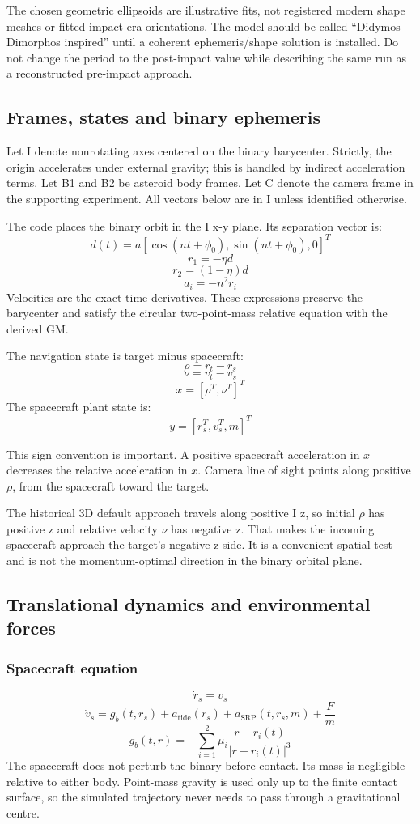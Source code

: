 \documentclass[11pt,a4paper]{article}
\begin{document}
The chosen geometric ellipsoids are illustrative fits, not registered modern shape meshes or fitted impact-era orientations. The model should be called ``Didymos-Dimorphos inspired'' until a coherent ephemeris/shape solution is installed. Do not change the period to the post-impact value while describing the same run as a reconstructed pre-impact approach.

\subsection{Frames, states and binary ephemeris}
Let I denote nonrotating axes centered on the binary barycenter. Strictly, the origin accelerates under external gravity; this is handled by indirect acceleration terms. Let B1 and B2 be asteroid body frames. Let C denote the camera frame in the supporting experiment. All vectors below are in I unless identified otherwise.

The code places the binary orbit in the I x-y plane. Its separation vector is:
\[ d(t) = a [\cos(nt+\phi_{0}), \sin(nt+\phi_{0}), 0]^T \]
\[ r_{1} = -\eta d \]
\[ r_{2} = (1-\eta)d \]
\[ a_{i} = -n^{2}r_{i} \]
Velocities are the exact time derivatives. These expressions preserve the barycenter and satisfy the circular two-point-mass relative equation with the derived GM.

The navigation state is target minus spacecraft:
\[ \rho = r_{t} - r_{s} \]
\[ \nu = v_{t} - v_{s} \]
\[ x = [\rho^{T}, \nu^{T}]^{T} \]
The spacecraft plant state is:
\[ y = [r_{s}^{T}, v_{s}^{T}, m]^{T} \]

This sign convention is important. A positive spacecraft acceleration in $x$ decreases the relative acceleration in $x$. Camera line of sight points along positive $\rho$, from the spacecraft toward the target.

The historical 3D default approach travels along positive I z, so initial $\rho$ has positive z and relative velocity $\nu$ has negative z. That makes the incoming spacecraft approach the target's negative-z side. It is a convenient spatial test and is not the momentum-optimal direction in the binary orbital plane.

\subsection{Translational dynamics and environmental forces}

\subsubsection{Spacecraft equation}
\[ \dot{r}_{s} = v_{s} \]
\[ \dot{v}_{s} = g_{b}(t, r_{s}) + a_{\mathrm{tide}}(r_{s}) + a_{\mathrm{SRP}}(t, r_{s}, m) + \frac{F}{m} \]
\[ g_{b}(t, r) = -\sum_{i=1}^{2} \mu_{i} \frac{r - r_{i}(t)}{|r - r_{i}(t)|^{3}} \]
The spacecraft does not perturb the binary before contact. Its mass is negligible relative to either body. Point-mass gravity is used only up to the finite contact surface, so the simulated trajectory never needs to pass through a gravitational centre.
\end{document}
